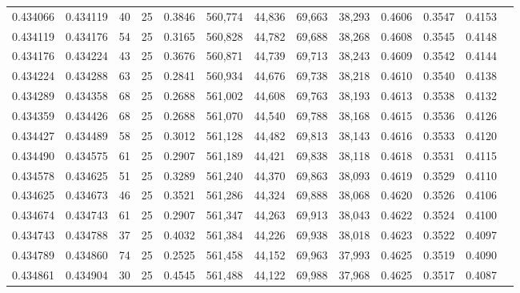 \begin{tabular}{rrrrrrrrrrrrr}
0.434066 & 0.434119 &    40 &  25 &                                     0.3846 & 560,774 &  44,836 &  69,663 &  38,293 & 0.4606 & 0.3547 & 0.4153 \\
0.434119 & 0.434176 &    54 &  25 &                                     0.3165 & 560,828 &  44,782 &  69,688 &  38,268 & 0.4608 & 0.3545 & 0.4148 \\
0.434176 & 0.434224 &    43 &  25 &                                     0.3676 & 560,871 &  44,739 &  69,713 &  38,243 & 0.4609 & 0.3542 & 0.4144 \\
0.434224 & 0.434288 &    63 &  25 &                                     0.2841 & 560,934 &  44,676 &  69,738 &  38,218 & 0.4610 & 0.3540 & 0.4138 \\
0.434289 & 0.434358 &    68 &  25 &                                     0.2688 & 561,002 &  44,608 &  69,763 &  38,193 & 0.4613 & 0.3538 & 0.4132 \\
0.434359 & 0.434426 &    68 &  25 &                                     0.2688 & 561,070 &  44,540 &  69,788 &  38,168 & 0.4615 & 0.3536 & 0.4126 \\
0.434427 & 0.434489 &    58 &  25 &                                     0.3012 & 561,128 &  44,482 &  69,813 &  38,143 & 0.4616 & 0.3533 & 0.4120 \\
0.434490 & 0.434575 &    61 &  25 &                                     0.2907 & 561,189 &  44,421 &  69,838 &  38,118 & 0.4618 & 0.3531 & 0.4115 \\
0.434578 & 0.434625 &    51 &  25 &                                     0.3289 & 561,240 &  44,370 &  69,863 &  38,093 & 0.4619 & 0.3529 & 0.4110 \\
0.434625 & 0.434673 &    46 &  25 &                                     0.3521 & 561,286 &  44,324 &  69,888 &  38,068 & 0.4620 & 0.3526 & 0.4106 \\
0.434674 & 0.434743 &    61 &  25 &                                     0.2907 & 561,347 &  44,263 &  69,913 &  38,043 & 0.4622 & 0.3524 & 0.4100 \\
0.434743 & 0.434788 &    37 &  25 &                                     0.4032 & 561,384 &  44,226 &  69,938 &  38,018 & 0.4623 & 0.3522 & 0.4097 \\
0.434789 & 0.434860 &    74 &  25 &                                     0.2525 & 561,458 &  44,152 &  69,963 &  37,993 & 0.4625 & 0.3519 & 0.4090 \\
0.434861 & 0.434904 &    30 &  25 &                                     0.4545 & 561,488 &  44,122 &  69,988 &  37,968 & 0.4625 & 0.3517 & 0.4087 \\

\end{tabular}
